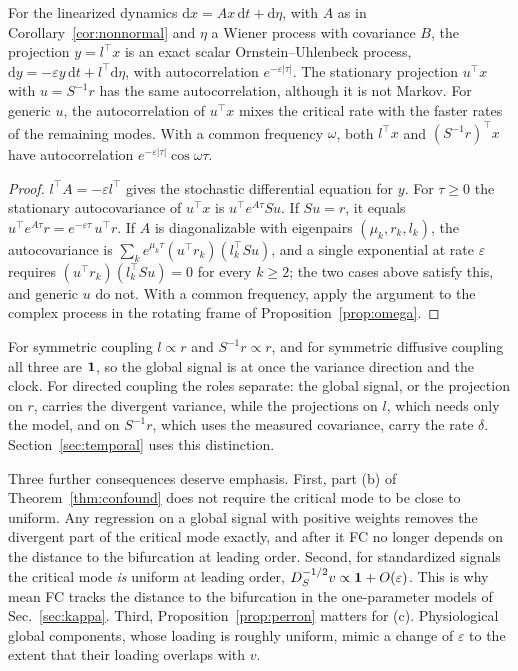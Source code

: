 \begin{proposition}\label{prop:left}
For the linearized dynamics $\mathrm dx=Ax\,\mathrm dt+\mathrm d\eta$, with $A$ as in Corollary~\ref{cor:nonnormal} and $\eta$ a Wiener process with covariance $B$, the projection $y=l^\top x$ is an exact scalar Ornstein--Uhlenbeck process, $\mathrm dy=-\varepsilon y\,\mathrm dt+l^\top\mathrm d\eta$, with autocorrelation $e^{-\varepsilon|\tau|}$. The stationary projection $u^\top x$ with $u=S^{-1}r$ has the same autocorrelation, although it is not Markov. For generic $u$, the autocorrelation of $u^\top x$ mixes the critical rate with the faster rates of the remaining modes. With a common frequency $\omega$, both $l^\top x$ and $(S^{-1}r)^\top x$ have autocorrelation $e^{-\varepsilon|\tau|}\cos\omega\tau$.
\end{proposition}

\begin{proof}
$l^\top A=-\varepsilon l^\top$ gives the stochastic differential equation for $y$. For $\tau\ge0$ the stationary autocovariance of $u^\top x$ is $u^\top e^{A\tau}Su$. If $Su=r$, it equals $u^\top e^{A\tau}r=e^{-\varepsilon\tau}\,u^\top r$. If $A$ is diagonalizable with eigenpairs $(\mu_k,r_k,l_k)$, the autocovariance is $\sum_ke^{\mu_k\tau}(u^\top r_k)(l_k^\top Su)$, and a single exponential at rate $\varepsilon$ requires $(u^\top r_k)(l_k^\top Su)=0$ for every $k\ge2$; the two cases above satisfy this, and generic $u$ do not. With a common frequency, apply the argument to the complex process in the rotating frame of Proposition~\ref{prop:omega}.
\end{proof}

For symmetric coupling $l\propto r$ and $S^{-1}r\propto r$, and for symmetric diffusive coupling all three are $\mathbf 1$, so the global
signal is at once the variance direction and the clock. For directed coupling the roles separate: the global signal, or the projection on $r$, carries the divergent variance, while the
projections on $l$, which needs only the model, and on $S^{-1}r$, which uses the measured covariance, carry the rate $\delta$. Section~\ref{sec:temporal} uses this distinction.

Three further consequences deserve emphasis. First, part (b) of Theorem~\ref{thm:confound} does not
require the critical mode to be close to uniform. Any regression on a global signal with positive
weights removes the divergent part of the critical mode exactly, and after it FC no longer depends on
the distance to the bifurcation at leading order. Second, for standardized signals the critical mode
\emph{is} uniform at leading order, $D_S^{-1/2}v\propto\mathbf 1+O(\varepsilon)$. This is why mean FC tracks
the distance to the bifurcation in the one-parameter models of Sec.~\ref{sec:kappa}. Third,
Proposition~\ref{prop:perron} matters for (c). Physiological global components, whose loading is
roughly uniform, mimic a change of $\varepsilon$ to the extent that their loading overlaps with $v$.

